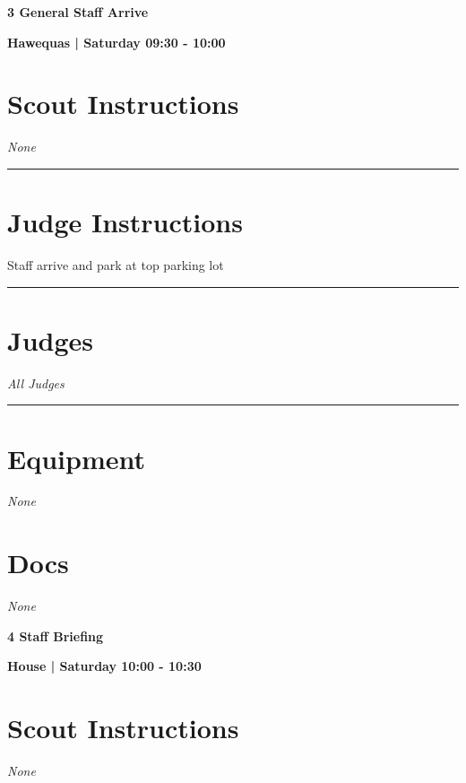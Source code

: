 \documentclass[10pt]{article}
\newcommand{\newtitle}[1]{\begin{center}{\Huge\bfseries #1 }\\ \vspace{5mm}\end{center}}
\newcommand{\newsubtitle}[1]{\begin{center}{\color{grey}\Large\bfseries #1 }\\ \vspace{5mm}\end{center}}
\begin{document}
	\vspace{1cm}


	\clearpage
		\newtitle{3 General Staff Arrive }
	\newsubtitle{Hawequas | Saturday 09:30 - 10:00}
		\setcounter{section}{2}
	\section*{Scout Instructions}
		\textit{None}
	
	\vspace{0.5cm}
	\hrule
	\vspace{0.5cm}

		\section*{Judge Instructions}
		Staff arrive and park at top parking lot
\vspace{0.5cm}
	\hrule
	\vspace{0.5cm}
		\section*{\faUsers \: Judges}

					\textit{All Judges}
			\vspace{0.5cm}
	\hrule
	\vspace{0.5cm}

	\begin{multicols}{2}

		\section*{\faWrench \: Equipment}

				\textit{None}
		
		\vfill\null
		\columnbreak

			\section*{\faFile \: Docs}
		 	\textit{None}
	

		\vfill\null

		\end{multicols}



	\vspace{1cm}


	\clearpage
		\newtitle{4 Staff Briefing }
	\newsubtitle{House | Saturday 10:00 - 10:30}
		\setcounter{section}{3}
	\section*{Scout Instructions}
		\textit{None}
	
\end{document}
